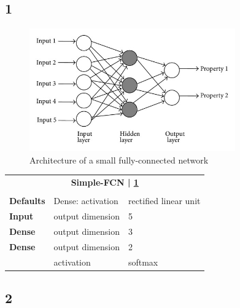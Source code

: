 \subsection*{1}
\begin{figure}[h]
	\centering
	\includegraphics[height=200px]{gfx/Dense_FFNetwork.jpg}
	\caption{Architecture of a small fully-connected network\\
		\cite{dense_network}}
	\label{fig:FFNetwork}
\end{figure}
\begin{tabularx}{\textwidth}[!h]{X X X}
	\multicolumn{3}{c}{\textbf{Simple-FCN | \ref{fig:FFNetwork}}}\\
	\\
	\hline
	\endhead
	\textbf{Defaults} & Dense: activation & rectified linear unit\\
	\hline
	\textbf{Input} & output dimension & 5\\
	[8pt]
	\textbf{Dense} & output dimension & 3\\
	[8pt]
	\textbf{Dense} & output dimension & 2\\
	& activation & softmax\\
	\hline
\end{tabularx}

\newpage

\subsection*{2}

